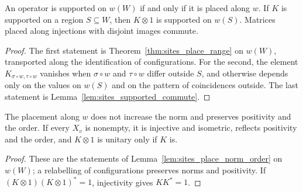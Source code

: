 \begin{theorem}
    \label{thm:sites_place_along_support}
    \leanok
    An operator is supported on $w(W)$ if and only if it is placed along $w$. If $K$ is
    supported on a region $S\subseteq W$, then $K\otimes1$ is supported on $w(S)$. Matrices
    placed along injections with disjoint images commute.
\end{theorem}
\begin{proof}\leanok
    The first statement is Theorem~\ref{thm:sites_place_range} on $w(W)$, transported along
    the identification of configurations. For the second, the element
    $K_{\sigma\circ w,\tau\circ w}$ vanishes when $\sigma\circ w$ and $\tau\circ w$ differ
    outside $S$, and otherwise depends only on the values on $w(S)$ and on the pattern of
    coincidences outside. The last statement is
    Lemma~\ref{lem:sites_supported_commute}.
\end{proof}

\begin{lemma}
    \label{lem:sites_place_along_norm_order}
    \leanok
    The placement along $w$ does not increase the norm and preserves positivity and the
    order. If every $X_v$ is nonempty, it is injective and isometric, reflects
    positivity and the order, and $K\otimes1$ is unitary only if $K$ is.
\end{lemma}
\begin{proof}\leanok
    These are the statements of Lemma~\ref{lem:sites_place_norm_order} on $w(W)$; a
    relabelling of configurations preserves norms and positivity. If
    $(K\otimes1)(K\otimes1)^*=1$, injectivity gives $KK^*=1$.
\end{proof}

